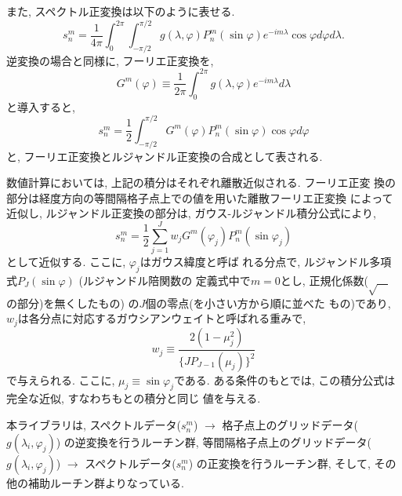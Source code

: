\documentclass[a4j]{jsarticle}
\begin{document}
また, スペクトル正変換は以下のように表せる.
\begin{equation}
s^m_n=\frac1{4\pi}\int^{2\pi}_0\int^{\pi/2}_{-\pi/2}
g(\lambda,\varphi)P^m_n(\sin\varphi)e^{-im\lambda}\cos\varphi d\varphi
d\lambda .
\end{equation}
逆変換の場合と同様に, フーリエ正変換を,
\begin{equation}
G^m(\varphi)\equiv\frac1{2\pi}\int^{2\pi}_0
g(\lambda,\varphi)e^{-im\lambda}d\lambda
\end{equation}
と導入すると, 
\begin{equation}
s^m_n=\frac12\int^{\pi/2}_{-\pi/2}G^m(\varphi)P^m_n(\sin\varphi)\cos\varphi
d\varphi
\end{equation}
と, フーリエ正変換とルジャンドル正変換の合成として表される.

数値計算においては, 上記の積分はそれぞれ離散近似される. フーリエ正変
換の部分は経度方向の等間隔格子点上での値を用いた離散フーリエ正変換
によって近似し,
ルジャンドル正変換の部分は, ガウス-ルジャンドル積分公式により,
\begin{equation}
s^m_n=\frac12\sum^J_{j=1}w_jG^m(\varphi_j)P^m_n(\sin\varphi_j)
\end{equation}
として近似する. ここに, $\varphi_j$はガウス緯度と呼ば
れる分点で, ルジャンドル多項式$P_J(\sin\varphi)$ (ルジャンドル陪関数の
定義式中で$m=0$とし, 正規化係数($\sqrt{\quad}$の部分)を無くしたもの)
の$J$個の零点(を小さい方から順に並べた
もの)であり, $w_j$は各分点に対応するガウシアンウェイトと呼ばれる重みで,
\begin{equation}
w_j\equiv\frac{2(1-\mu_j^2)}{\{JP_{J-1}(\mu_j)\}^2}
\end{equation}
で与えられる. ここに, $\mu_j\equiv\sin\varphi_j$である.
ある条件のもとでは, この積分公式は完全な近似, すなわちもとの積分と同じ
値を与える.

本ライブラリは, 
スペクトルデータ($s^m_n$) 
$\to$ 格子点上のグリッドデータ($g(\lambda_i,\varphi_j)$) 
の逆変換を行うルーチン群,
等間隔格子点上のグリッドデータ($g(\lambda_i,\varphi_j)$) 
$\to$ スペクトルデータ($s^m_n$) 
の正変換を行うルーチン群,
そして, その他の補助ルーチン群よりなっている.
\end{document}
